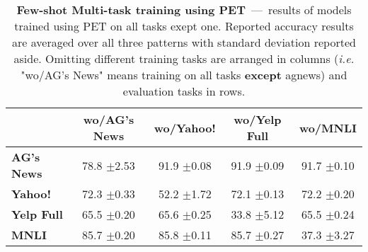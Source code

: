 \begin{table}[b]
	\fontsize{7}{10}
	\selectfont
	\begin{tabular*}{\columnwidth}{l@{\extracolsep{\fill}}cccc}
		\toprule
		& \textbf{wo/AG's News} & \textbf{wo/Yahoo!} & \textbf{wo/Yelp Full} & \textbf{wo/MNLI} \\
		\hline
		\textbf{AG's News}    & 78.8 \tiny$\pm$2.53        & 91.9 \tiny$\pm$0.08        & 91.9   \tiny$\pm$0.09          & 91.7 \tiny$\pm$0.10       \\
		\textbf{Yahoo!}     & 72.3 \tiny$\pm$0.33        & 52.2 \tiny$\pm$1.72        & 72.1   \tiny$\pm$0.13          & 72.2 \tiny$\pm$0.20       \\
		\textbf{Yelp Full} & 65.5 \tiny$\pm$0.20        & 65.6 \tiny$\pm$0.25        & 33.8   \tiny$\pm$5.12          & 65.5 \tiny$\pm$0.24       \\
		\textbf{MNLI}      & 85.7 \tiny$\pm$0.20        & 85.8 \tiny$\pm$0.11        & 85.7   \tiny$\pm$0.27          & 37.3 \tiny$\pm$3.27       \\
		\bottomrule
	\end{tabular*}
	\caption{\textbf{Few-shot Multi-task training using PET}~---~results of models trained using PET on all tasks exept one. Reported accuracy results are averaged over all three patterns with standard deviation reported aside. Omitting different training tasks are arranged in columns (\textit{i.e.} "wo/AG's News" means training on all tasks \textbf{except} agnews) and evaluation tasks in rows.}\label{tab:multi-use-logits-summary}
	\vspace{-4mm}
\end{table}

